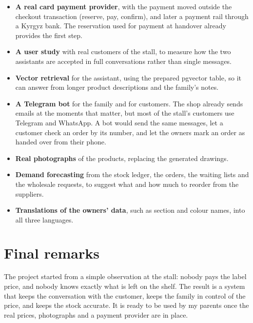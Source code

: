 \begin{itemize}
	\item \textbf{A real card payment provider}, with the payment moved outside the checkout transaction (reserve, pay,
	confirm), and later a payment rail through a Kyrgyz bank. The reservation used for payment at handover already
	provides the first step.
	\item \textbf{A user study} with real customers of the stall, to measure how the two assistants are accepted in full
	conversations rather than single messages.
	\item \textbf{Vector retrieval} for the assistant, using the prepared pgvector table, so it can answer from longer
	product descriptions and the family's notes.
	\item \textbf{A Telegram bot} for the family and for customers. The shop already sends emails at the moments that
	matter, but most of the stall's customers use Telegram and WhatsApp. A bot would send the same messages, let a
	customer check an order by its number, and let the owners mark an order as handed over from their phone.
	\item \textbf{Real photographs} of the products, replacing the generated drawings.
	\item \textbf{Demand forecasting} from the stock ledger, the orders, the waiting lists and the wholesale requests, to
	suggest what and how much to reorder from the suppliers.
	\item \textbf{Translations of the owners' data}, such as section and colour names, into all three languages.
\end{itemize}

\section{Final remarks}

The project started from a simple observation at the stall: nobody pays the label price, and nobody knows exactly
what is left on the shelf. The result is a system that keeps the conversation with the customer, keeps the family in
control of the price, and keeps the stock accurate. It is ready to be used by my parents once the real prices,
photographs and a payment provider are in place.

